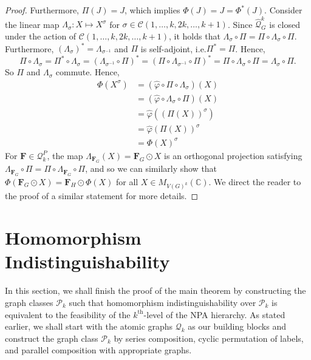 \documentclass[11pt,a4paper]{article}
\theoremstyle{plain}
\theoremstyle{remark}
\theoremstyle{definition}
\newcommand{\complex}{\mathbb{C}}
\def\calP{{\mathcal P}} \def\calQ{{\mathcal Q}} \def\calR{{\mathcal R}}
\newcommand{\cyclicpermutations}{\mathscr{C}(1,\dots, k, 2k, \dots, k+1)}
\begin{document}
\begin{proof}
		Furthermore, $\Pi(J) = J$, which implies $\Phi(J) =J = \Phi^*(J)$. Consider the linear map $\Lambda_\sigma \colon X \mapsto X^\sigma$ for $\sigma \in \cyclicpermutations$. Since $\widehat{\mathcal{Q}}^k_G$ is closed under the action of $\cyclicpermutations$, it holds that $\Lambda_\sigma \circ \Pi = \Pi \circ \Lambda_\sigma \circ \Pi $. Furthermore, $(\Lambda_{\sigma})^{*} = \Lambda_{\sigma^{-1}}$ and $\Pi$ is self-adjoint, i.e.\@ $\Pi^* = \Pi$. Hence,
		\[
		\Pi \circ \Lambda_{\sigma}
		= \Pi^* \circ \Lambda_\sigma
		= (\Lambda_{\sigma^{-1}} \circ \Pi)^*
		= (\Pi \circ \Lambda_{\sigma^{-1}} \circ \Pi)^*
		= \Pi \circ \Lambda_{\sigma} \circ \Pi
		= \Lambda_\sigma \circ \Pi.
		\]
		So $\Pi$ and $\Lambda_\sigma$ commute. Hence,
		\begin{align*}
		\Phi(X^\sigma) & = (\widehat{\varphi} \circ \Pi \circ \Lambda_\sigma)(X) \\
			& = (\widehat{\varphi} \circ \Lambda_\sigma \circ \Pi )(X) \\
            & = \widehat{\varphi} ((\Pi(X))^{\sigma}) \\
            & =  \widehat{\varphi}(\Pi(X))^{\sigma} \\
			& = \Phi(X)^\sigma
		\end{align*}
    For $\boldsymbol{F} \in \calQ_k^P$, the map $\Lambda_{\boldsymbol{F}_G}(X) = \boldsymbol{F}_G \odot X$ is an orthogonal projection satisfying $\Lambda_{\boldsymbol{F}_G} \circ \Pi = \Pi \circ \Lambda_{\boldsymbol{F}_G} \circ \Pi$, and so we can similarly show that $\Phi(\boldsymbol{F}_G \odot X) = \boldsymbol{F}_H \odot \Phi(X)$ for all $X \in M_{V(G)^k}(\complex)$. We direct the reader to the proof of a similar statement \cite[Theorem 6.2]{david_mathprog} for more details. 
\end{proof}

\section{Homomorphism Indistinguishability}\label{sec:hom-ind}

In this section, we shall finish the proof of the main theorem by constructing the graph classes $\calP_k$ such that homomorphism indistinguishability over $\mathcal{P}_k$ is equivalent to the feasibility of the $k^{\text{th}}$-level of the NPA hierarchy. As stated earlier, we shall start with the atomic graphs $\calQ_k$ as our building blocks and construct the graph class $\calP_k$ by series composition, cyclic permutation of labels, and parallel composition with appropriate graphs. 
\end{document}
